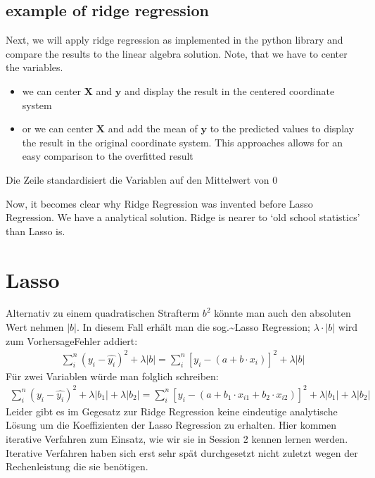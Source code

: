 \documentclass[letterpaper,10pt,english]{jupyterBook}
\begin{document}
\subsection{example of ridge regression}
\label{\detokenize{Regression_Techniques:example-of-ridge-regression}}
\sphinxAtStartPar
Next, we will apply ridge regression as implemented in the python  library and compare the results to the linear algebra solution. Note, that we have to center the variables.
\begin{itemize}
\item {} 
\sphinxAtStartPar
we can center \(\mathbf{X}\) and \(\mathbf{y}\) and display the result in the centered coordinate system

\item {} 
\sphinxAtStartPar
or we can center \(\mathbf{X}\) and add the mean of \(\mathbf{y}\) to the predicted values to display the result in the original coordinate system. This approaches allows for an easy comparison to the overfitted result

\end{itemize}

\sphinxAtStartPar
Die Zeile  standardisiert die Variablen auf den Mittelwert von 0

\noindent{}

\sphinxAtStartPar
Now, it becomes clear why Ridge Regression was invented before Lasso Regression. We have a analytical solution. Ridge is nearer to ‘old school statistics’ than Lasso is.


\section{Lasso}
\label{\detokenize{Regression_Techniques:lasso}}
\sphinxAtStartPar
Alternativ zu einem quadratischen Strafterm \(b^2\) könnte man auch den absoluten Wert nehmen \(|b|\). In diesem Fall erhält man die sog.\textasciitilde{}Lasso Regression; \(\lambda\cdot |b|\) wird zum Vorhersage\sphinxhyphen{}Fehler addiert:
\begin{equation*}
\begin{split}\sum_i^{n}(y_i - \hat{y_i})^2 + \lambda |b|= \sum_i^{n}[y_i - (a + b\cdot x_i)]^{2}+ \lambda |b|\end{split}
\end{equation*}
\sphinxAtStartPar
Für zwei Variablen würde man folglich schreiben:
\begin{equation*}
\begin{split}\sum_i^{n}(y_i - \hat{y_i})^2 + \lambda |b_1| + \lambda |b_2|= \sum_i^{n}[y_i - (a + b_1\cdot x_{i1} + b_2\cdot x_{i2})]^{2}+ \lambda |b_1| + \lambda |b_2|\end{split}
\end{equation*}
\sphinxAtStartPar
Leider gibt es im Gegesatz zur Ridge Regression keine eindeutige analytische Lösung um die Koeffizienten der Lasso Regression zu erhalten. Hier kommen iterative Verfahren zum Einsatz, wie wir sie in Session 2 kennen lernen werden.
Iterative Verfahren haben sich erst sehr spät durchgesetzt \sphinxhyphen{} nicht zuletzt wegen der Rechenleistung die sie benötigen.
\end{document}
